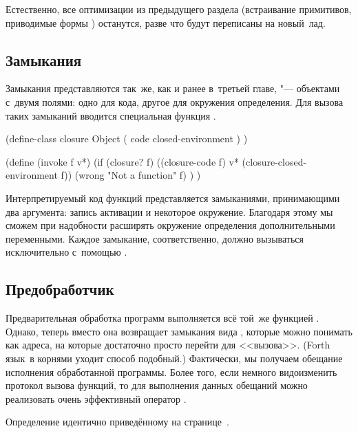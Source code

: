 Естественно, все оптимизации из предыдущего раздела (встраивание примитивов,
приводимые формы {\itd}) останутся, разве что будут переписаны на новый~лад.


\subsection{Замыкания}\label{fast/dilute/ssect:closures}

Замыкания представляются так~же, как и ранее в~третьей главе, "--- объектами
с~двумя полями: одно для кода, другое для окружения определения. Для вызова
таких замыканий вводится специальная функция .

\begin{code:lisp}
(define-class closure Object
  ( code
    closed-environment ) )

(define (invoke f v*)
  (if (closure? f)
      ((closure-code f) v* (closure-closed-environment f))
      (wrong "Not a function" f) ) )
\end{code:lisp}

Интерпретируемый код функций представляется замыканиями, принимающими два
аргумента: запись активации и некоторое окружение. Благодаря этому мы сможем при
надобности расширять окружение определения дополнительными переменными. Каждое
замыкание, соответственно, должно вызываться исключительно с~помощью
.


\subsection{Предобработчик}\label{fast/dilute/ssect:pretreater}

Предварительная обработка программ выполняется всё той~же функцией .
Однако, теперь вместо  она возвращает замыкания вида
, которые можно понимать как адреса, на которые достаточно
просто перейти для <<вызова>>. (Forth язык~в корнями уходит способ подобный.)
Фактически, мы получаем обещание исполнения обработанной программы. Более того,
если немного видоизменить протокол вызова функций, то для выполнения данных
обещаний можно реализовать очень эффективный оператор .

Определение  идентично приведённому
на странице~\pageref{fast/reject/src:meaning}.


